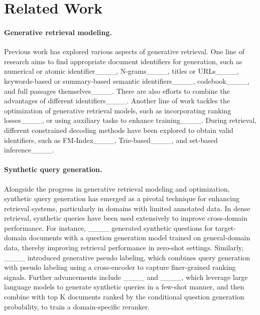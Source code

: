 \section{Related Work}
\paragraph{Generative retrieval modeling.}
Previous work has explored various aspects of generative retrieval. One line of research aims to find appropriate document identifiers for generation, such as numerical or atomic identifier____, N-grams____, titles or URLs____, keywords-based or summary-based semantic identifiers____, codebook____, and full passages themselves____. There are also efforts to combine the advantages of different identifiers____. Another line of work tackles the optimization of generative retrieval models, such as incorporating ranking losses____, or using auxiliary tasks to enhance training____. During retrieval, different constrained decoding methods have been explored to obtain valid identifiers, such as FM-Index____, Trie-based____, and set-based inference____.

\paragraph{Synthetic query generation.}
Alongside the progress in generative retrieval modeling and optimization, synthetic query generation has emerged as a pivotal technique for enhancing retrieval systems, particularly in domains with limited annotated data.
In dense retrieval, synthetic queries have been used extensively to improve cross-domain performance.
For instance, ____ generated synthetic questions for target-domain documents with a question generation model trained on general-domain data, thereby improving retrieval performance in zero-shot settings.
Similarly, ____ introduced generative pseudo labeling, which combines query generation with pseudo labeling using a cross-encoder to capture finer-grained ranking signals.
Further advancements include ____ and ____, which leverage large language models to generate synthetic queries in a few-shot manner, and then combine with top K documents ranked by the conditional question generation probability, to train a domain-specific reranker.

